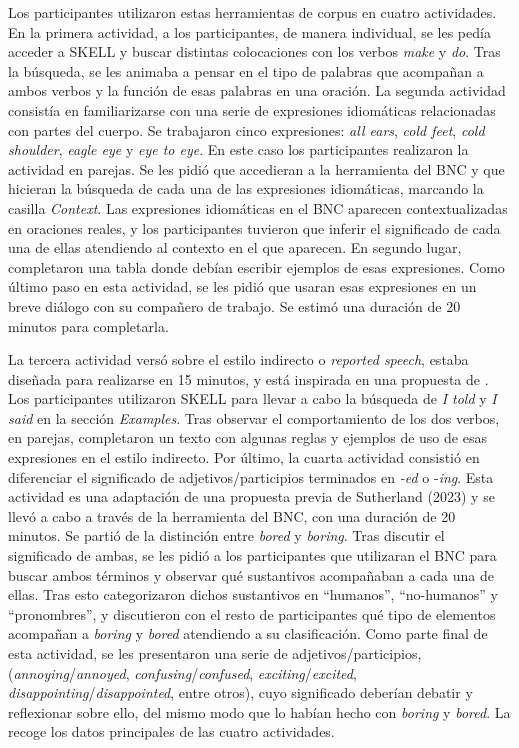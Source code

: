 Los participantes utilizaron estas herramientas de corpus en cuatro
actividades. En la primera actividad, a los participantes, de manera
individual, se les pedía acceder a SKELL y buscar distintas colocaciones
con los verbos \emph{make} y \emph{do}. Tras la búsqueda, se les animaba
a pensar en el tipo de palabras que acompañan a ambos verbos y la
función de esas palabras en una oración. La segunda actividad consistía
en familiarizarse con una serie de expresiones idiomáticas relacionadas
con partes del cuerpo. Se trabajaron cinco expresiones: \emph{all ears},
\emph{cold feet}, \emph{cold shoulder}, \emph{eagle eye} y \emph{eye to
eye}. En este caso los participantes realizaron la actividad en parejas.
Se les pidió que accedieran a la herramienta del BNC y que hicieran la
búsqueda de cada una de las expresiones idiomáticas, marcando la casilla
\emph{Context}. Las expresiones idiomáticas en el BNC aparecen
contextualizadas en oraciones reales, y los participantes tuvieron que
inferir el significado de cada una de ellas atendiendo al contexto en el
que aparecen. En segundo lugar, completaron una tabla donde debían
escribir ejemplos de esas expresiones. Como último paso en esta
actividad, se les pidió que usaran esas expresiones en un breve diálogo
con su compañero de trabajo. Se estimó una duración de 20 minutos para
completarla.

La tercera actividad versó sobre el estilo indirecto o \emph{reported
speech}, estaba diseñada para realizarse en 15 minutos, y está inspirada
en una propuesta de \textcite{brown2023using}. Los participantes utilizaron SKELL
para llevar a cabo la búsqueda de \emph{I told} y \emph{I said} en la
sección \emph{Examples}. Tras observar el comportamiento de los dos
verbos, en parejas, completaron un texto con algunas reglas y ejemplos
de uso de esas expresiones en el estilo indirecto. Por último, la cuarta
actividad consistió en diferenciar el significado de
adjetivos/participios terminados en \emph{-ed} o -\emph{ing}. Esta
actividad es una adaptación de una propuesta previa de Sutherland (2023)
y se llevó a cabo a través de la herramienta del BNC, con una duración
de 20 minutos. Se partió de la distinción entre \emph{bored} y
\emph{boring}. Tras discutir el significado de ambas, se les pidió a los
participantes que utilizaran el BNC para buscar ambos términos y
observar qué sustantivos acompañaban a cada una de ellas. Tras esto
categorizaron dichos sustantivos en ``humanos'', ``no-humanos'' y
``pronombres'', y discutieron con el resto de participantes qué tipo de
elementos acompañan a \emph{boring} y \emph{bored} atendiendo a su
clasificación. Como parte final de esta actividad, se les presentaron
una serie de adjetivos/participios, (\emph{annoying}/\emph{annoyed},
\emph{confusing}/\emph{confused}, \emph{exciting}/\emph{excited},
\emph{disappointing}/\emph{disappointed}, entre otros), cuyo significado
deberían debatir y reflexionar sobre ello, del mismo modo que lo habían
hecho con \emph{boring} y \emph{bored}. La  recoge los datos
principales de las cuatro actividades.

